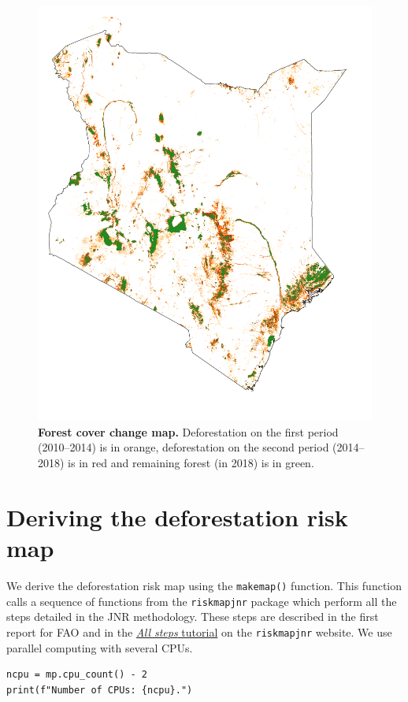 \documentclass[paper=a4, 12pt, DIV=12]{scrartcl}
\begin{document}
\begin{figure}[H]
\centering
\includegraphics[width=0.8\linewidth]{outputs_kenya/fcc123.png}
\caption{\label{fig:org590bebb}\textbf{Forest cover change map.} Deforestation on the first period (2010--2014) is in orange, deforestation on the second period (2014--2018) is in red and remaining forest (in 2018) is in green.}
\end{figure}

\section{Deriving the deforestation risk map}
\label{sec:org8c749d2}

We derive the deforestation risk map using the \texttt{makemap()} function. This function calls a sequence of functions from the \texttt{riskmapjnr} package which perform all the steps detailed in the JNR methodology. These steps are described in the first report for FAO and in the \href{https://ecology.ghislainv.fr/riskmapjnr/notebooks/steps.html}{\emph{All steps} tutorial} on the \texttt{riskmapjnr} website. We use parallel computing with several CPUs.

\begin{verbatim}
ncpu = mp.cpu_count() - 2
print(f"Number of CPUs: {ncpu}.") 
\end{verbatim}
\end{document}
